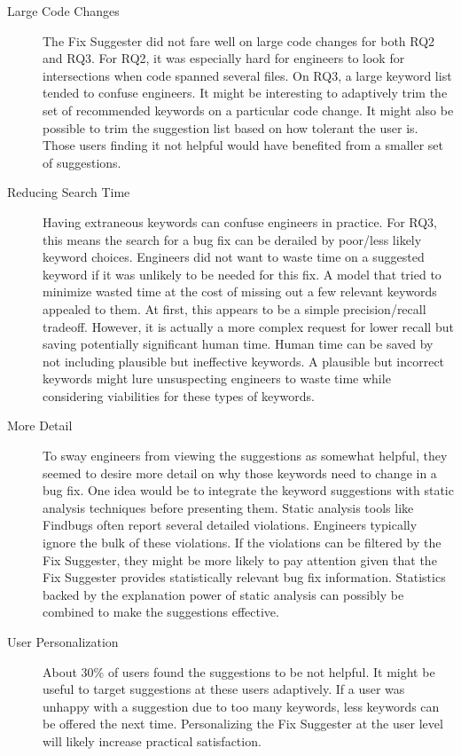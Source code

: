 \documentclass[10pt, conference, letterpaper, compsocconf]{IEEEtran}
\begin{document}
\begin{description}
	\item[Large Code Changes] The Fix Suggester did not fare well on large code changes for both RQ2 and RQ3. For RQ2, it was especially hard for engineers to look for intersections when code spanned several files. On RQ3, a large keyword list tended to confuse engineers. It might be interesting to adaptively trim the set of recommended keywords on a particular code change. It might also be possible to trim the suggestion list based on how tolerant the user is. Those users finding it not helpful would have benefited from a smaller set of suggestions.
	\item[Reducing Search Time] Having extraneous keywords can confuse engineers in practice. For RQ3, this means the search for a bug fix can be derailed by poor/less likely keyword choices. Engineers did not want to waste time on a suggested keyword if it was unlikely to be needed for this fix. A model that tried to minimize wasted time at the cost of missing out a few relevant keywords appealed to them. At first, this appears to be a simple precision/recall tradeoff. However, it is actually a more complex request for lower recall but saving potentially significant human time. Human time can be saved by not including plausible but ineffective keywords. A plausible but incorrect keywords might lure unsuspecting engineers to waste time while considering viabilities for these types of keywords.
	\item[More Detail] To sway engineers from viewing the suggestions as somewhat helpful, they seemed to desire more detail on why those keywords need to change in a bug fix. One idea would be to integrate the keyword suggestions with static analysis techniques before presenting them. Static analysis tools like Findbugs often report several detailed violations. Engineers typically ignore the bulk of these violations. If the violations can be filtered by the Fix Suggester, they might be more likely to pay attention given that the Fix Suggester provides statistically relevant bug fix information. Statistics backed by the explanation power of static analysis can possibly be combined to make the suggestions effective.
	\item[User Personalization] About 30\% of users found the suggestions to be not helpful. It might be useful to target suggestions at these users adaptively. If a user was unhappy with a suggestion due to too many keywords, less keywords can be offered the next time. Personalizing the Fix Suggester at the user level will likely increase practical satisfaction.
	
\end{description}
\end{document}
